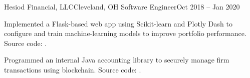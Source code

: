 \begin{ritemize}
	{Hesiod Financial, LLC}{Cleveland, OH}
	{Software Engineer}{Oct 2018 -- Jan 2020}
	\item Implemented a Flask-based web app using Scikit-learn and Plotly Dash to configure and train machine-learning models to improve portfolio performance. Source code: .
	\item Programmed an internal Java accounting library to securely manage firm transactions using blockchain. Source code: .
\end{ritemize}